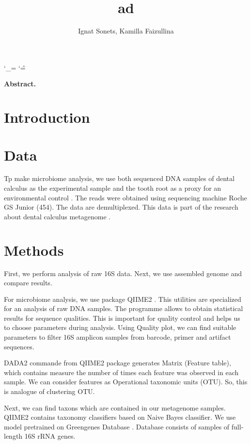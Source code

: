 \documentclass{article}
\title{   ad }
\author{ Ignat Sonets, Kamilla Faizullina}
\date{\empty}
\begin{document}
	
		\catcode`\_=\active
	\catcode`\^=\active
	
\maketitle
 
\textbf{Abstract.}   
 
\section{Introduction}



 
 \section{Data}
Tp make microbiome analysis, we use both sequenced DNA   samples of dental calculus as the experimental sample and the tooth root as a proxy for an environmental control \cite{Data}. The reads were obtained using sequencing machine Roche GS Junior (454). The data are demultiplexed. This data is part  of the research about  dental calculus metagenome \cite{DataResearch}. 

 

\section{Methods}
First, we perform analysis of raw 16S data. Next, we use assembled genome and compare results. 


 For  microbiome analysis, we use package QIIME2 \cite{quime}. This utilities are specialized for an analysis of raw DNA samples. The programme allows to obtain statistical results for sequence qualities. This is important for quality control and helps us to choose parameters during analysis. Using Quality plot, we can find suitable parameters to filter 16S amplicon  samples from barcode, primer and artifact sequences. 
 
 DADA2 commande from QIIME2 package generates Matrix (Feature table), which contains measure the number of times each feature was observed in each sample. We can consider  features as Operational taxonomic units (OTU). So, this is analogue of clustering OTU.
 
 Next, we can find taxons which are contained in our metagenome samples. QIIME2 contains taxonomy classifiers based on Naive Bayes classifier. We use model pretrained on Greengenes Database \cite{Green}. Database consists of samples of full-length 16S rRNA genes. 
 
\end{document}
